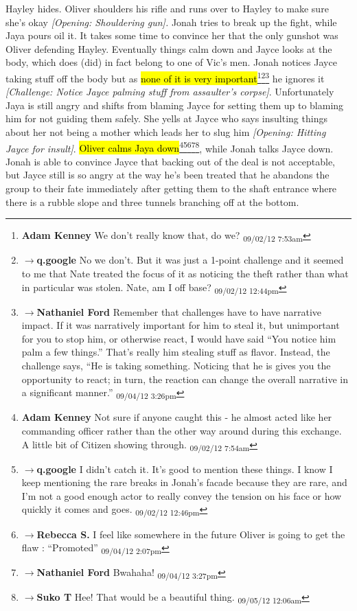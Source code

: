 Hayley hides.  Oliver shoulders his rifle and runs over to Hayley to make sure she's okay\textit{ {[}Opening: Shouldering gun{]}.}  Jonah tries to break up the fight, while Jaya pours oil it.  It takes some time to convince her that the only gunshot was Oliver defending Hayley.  Eventually things calm down and Jayce looks at the body, which does (did) in fact belong to one of Vic's men.  Jonah notices Jayce taking stuff off the body but as \hl{none of it is very important}\footnote{\textbf{Adam Kenney }We don't really know that, do we? \textsubscript{09/02/12 7:53am}}\footnote{$\rightarrow$\textbf{q.google }No we don't.  But it was just a 1-point challenge and it seemed to me that Nate treated the focus of it as noticing the theft rather than what in particular was stolen.  Nate, am I off base? \textsubscript{09/02/12 12:44pm}}\footnote{$\rightarrow$\textbf{Nathaniel Ford }Remember that challenges have to have narrative impact. If it was narratively important for him to steal it, but unimportant for you to stop him, or otherwise react, I would have said ``You notice him palm a few things.'' That's really him stealing stuff as flavor. Instead, the challenge  says, ``He is taking something. Noticing that he is gives you the opportunity to react; in turn, the reaction can change the overall narrative in a significant manner.'' \textsubscript{09/04/12 3:26pm}} he ignores it\textit{ {[}Challenge: Notice Jayce palming stuff from assaulter's corpse{]}}.  Unfortunately Jaya is still angry and shifts from blaming Jayce for setting them up to blaming him for not guiding them safely.   She yells at Jayce who says insulting things about her not being a mother which leads her to slug him\textit{ {[}Opening: Hitting Jayce for insult{]}}.   \hl{Oliver calms Jaya down}\footnote{\textbf{Adam Kenney }Not sure if anyone caught this - he almost acted like her commanding officer rather than the other way around during this exchange.  A little bit of Citizen showing through. \textsubscript{09/02/12 7:54am}}\footnote{$\rightarrow$\textbf{q.google }I didn't catch it.  It's good to mention these things.  I know I keep mentioning the rare breaks in Jonah's facade because they are rare, and I'm not a good enough actor to really convey the tension on his face or how quickly it comes and goes. \textsubscript{09/02/12 12:46pm}}\footnote{$\rightarrow$\textbf{Rebecca S. }I feel like somewhere in the future Oliver is going to get the flaw : ``Promoted'' \textsubscript{09/04/12 2:07pm}}\footnote{$\rightarrow$\textbf{Nathaniel Ford }Bwahaha! \textsubscript{09/04/12 3:27pm}}\footnote{$\rightarrow$\textbf{Suko T }Hee!  That would be a beautiful thing. \textsubscript{09/05/12 12:06am}}, while Jonah talks Jayce down.  Jonah is able to convince Jayce that backing out of the deal is not acceptable, but Jayce still is so angry at the way he's been treated that he abandons the group to their fate immediately after getting them to the shaft entrance where there is a rubble slope and three tunnels branching off at the bottom.



